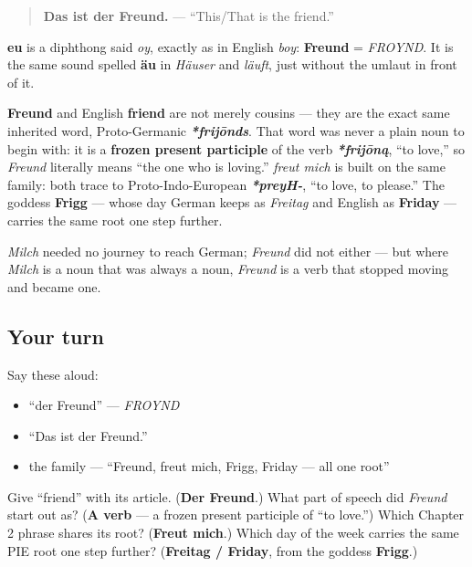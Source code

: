\begin{quote}
\textbf{Das ist der Freund.} — \textquotedblleft{}This/That is the friend.\textquotedblright{}
\end{quote}

\begin{sounds}
\textbf{eu} is a diphthong said \emph{oy}, exactly as in English \emph{boy}: \textbf{Freund} = \emph{FROYND}. It is the same sound spelled \textbf{äu} in \emph{Häuser} and \emph{läuft}, just without the umlaut in front of it.
\end{sounds}

\begin{cousinweb}
\textbf{Freund} and English \textbf{friend} are not merely cousins — they are the exact same inherited word, Proto-Germanic \emph{\textbf{*frijōnds}}. That word was never a plain noun to begin with: it is a \textbf{frozen present participle} of the verb \emph{\textbf{*frijōną}}, \textquotedblleft{}to love,\textquotedblright{} so \emph{Freund} literally means \textquotedblleft{}the one who is loving.\textquotedblright{} \emph{freut mich} is built on the same family: both trace to Proto-Indo-European \emph{\textbf{*preyH-}}, \textquotedblleft{}to love, to please.\textquotedblright{} The goddess \textbf{Frigg} — whose day German keeps as \emph{Freitag} and English as \textbf{Friday} — carries the same root one step further.

\emph{Milch} needed no journey to reach German; \emph{Freund} did not either — but where \emph{Milch} is a noun that was always a noun, \emph{Freund} is a verb that stopped moving and became one.
\end{cousinweb}

\subsection*{Your turn}
Say these aloud:

\begin{itemize}
\raggedright
  \item \textquotedblleft{}der Freund\textquotedblright{} — \emph{FROYND}
  \item \textquotedblleft{}Das ist der Freund.\textquotedblright{}
  \item the family — \textquotedblleft{}Freund, freut mich, Frigg, Friday — all one root\textquotedblright{}
\end{itemize}

\begin{tcolorbox}[breakable,colback=teal!4,colframe=teal!35!black,title={Before you move on}]
Give \textquotedblleft{}friend\textquotedblright{} with its article. (\textbf{Der Freund}.) What part of speech did \emph{Freund} start out as? (\textbf{A verb} — a frozen present participle of \textquotedblleft{}to love.\textquotedblright{}) Which Chapter 2 phrase shares its root? (\textbf{Freut mich}.) Which day of the week carries the same PIE root one step further? (\textbf{Freitag / Friday}, from the goddess \textbf{Frigg}.)
\end{tcolorbox}
